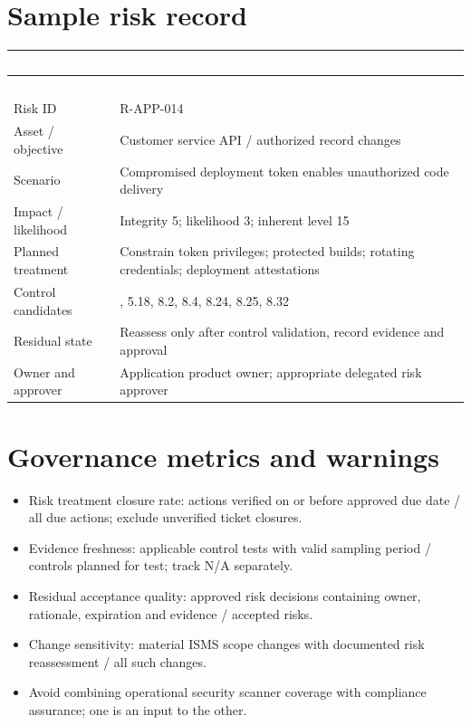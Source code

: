 \documentclass[11pt,letterpaper]{article}
\begin{document}
\section{Sample risk record}
\small{}\begin{longtable}{>{\raggedright\arraybackslash}p{}>{\raggedright\arraybackslash}p{}}
\rowcolor{navy} \textcolor{white}{\textbf{Attribute}} & \textcolor{white}{\textbf{Example}}\\
\endfirsthead
\rowcolor{navy} \textcolor{white}{\textbf{Attribute}} & \textcolor{white}{\textbf{Example}}\\
\endhead
Risk ID & R-APP-014\\
Asset / objective & Customer service API / authorized record changes\\
Scenario & Compromised deployment token enables unauthorized code delivery\\
Impact / likelihood & Integrity 5; likelihood 3; inherent level 15\\
Planned treatment & Constrain token privileges; protected builds; rotating credentials; deployment attestations\\
Control candidates & 5.16, 5.18, 8.2, 8.4, 8.24, 8.25, 8.32\\
Residual state & Reassess only after control validation, record evidence and approval\\
Owner and approver & Application product owner; appropriate delegated risk approver\\
\end{longtable}\normalsize

\section{Governance metrics and warnings}
\begin{itemize}
\item Risk treatment closure rate: actions verified on or before approved due date / all due actions; exclude unverified ticket closures.
\item Evidence freshness: applicable control tests with valid sampling period / controls planned for test; track N/A separately.
\item Residual acceptance quality: approved risk decisions containing owner, rationale, expiration and evidence / accepted risks.
\item Change sensitivity: material ISMS scope changes with documented risk reassessment / all such changes.
\item Avoid combining operational security scanner coverage with compliance assurance; one is an input to the other.
\end{itemize}
\end{document}
